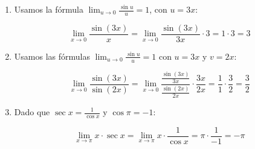 \documentclass[answers]{exam} %
\begin{document}
\begin{questions}
\begin{solution}
\begin{enumerate}[label=\alph*.]
			\item Usamos la fórmula \(\lim_{u \to 0} \frac{\sin u}{u} = 1\), con \(u = 3x\):
	
			\[
			\lim_{x\to{0}} \frac{\sin(3x)}{x} = \lim_{x\to{0}} \frac{\sin(3x)}{3x} \cdot 3 = 1 \cdot 3 = 3
			\]
	
			\item Usamos las fórmulas \(\lim_{u \to 0} \frac{\sin u}{u} = 1\) con \(u = 3x\) y \(v = 2x\):
	
			\[
			\lim_{x\to{0}} \frac{\sin(3x)}{\sin(2x)} = \lim_{x\to{0}} \frac{\frac{\sin(3x)}{3x}}{\frac{\sin(2x)}{2x}} \cdot \frac{3x}{2x} = \frac{1}{1} \cdot \frac{3}{2} = \frac{3}{2}
			\]
	
			\item Dado que \(\sec x = \frac{1}{\cos x}\) y \(\cos \pi = -1\):
	
			\[
			\lim_{x\to{\pi}} x \cdot \sec x = \lim_{x\to{\pi}} x \cdot \frac{1}{\cos x} = \pi \cdot \frac{1}{-1} = -\pi
			\]
	
		\end{enumerate}
	\end{solution}
	

	\vspace{0.5cm}

\end{questions}
\end{document}
